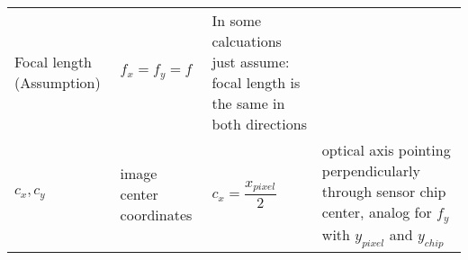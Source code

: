 \documentclass[
]{article}
\newcommand{\columnA}{0.06}
\newcommand{\columnB}{0.18}
\newcommand{\columnC}{0.33}
\newcommand{\columnD}{0.33}
\begin{document}
\begin{longtable}[]{@{}llll@{}}
\begin{minipage}[t]{\columnB\columnwidth}
Focal length (Assumption)\strut
\end{minipage} & \begin{minipage}[t]{\columnC\columnwidth}\raggedright
\(f_x = f_y = f\)\strut
\end{minipage} & \begin{minipage}[t]{\columnD\columnwidth}\raggedright
In some calcuations just assume: focal length is the same in both
directions\strut
\end{minipage}\hline\tabularnewline
\begin{minipage}[t]{\columnA\columnwidth}\raggedright
\(c_x, c_y\)\strut
\end{minipage} & \begin{minipage}[t]{\columnB\columnwidth}\raggedright
image center coordinates\strut
\end{minipage} & \begin{minipage}[t]{\columnC\columnwidth}\raggedright
\(c_x=\dfrac{x_{pixel}}{2}\)\strut
\end{minipage} & \begin{minipage}[t]{\columnD\columnwidth}\raggedright
optical axis pointing perpendicularly through sensor chip center, analog
for \(f_y\) with \(y_{pixel}\) and \(y_{chip}\)\strut
\end{minipage}\hline\tabularnewline
\bottomrule
\end{longtable}
\end{document}
